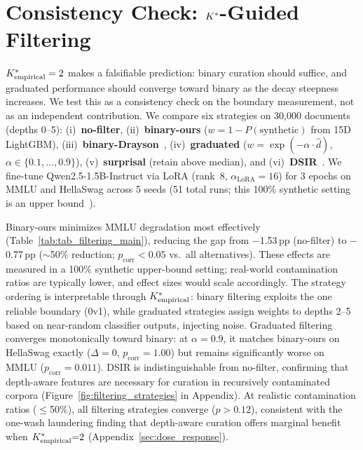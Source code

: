 \section{Consistency Check: ${K^*}$-Guided Filtering}
\label{sec:filtering}

${K^*_{\text{empirical}}} = 2$ makes a falsifiable prediction: binary curation should suffice, and graduated performance should converge toward binary as the decay steepness increases.
We test this as a consistency check on the boundary measurement, not as an independent contribution.
We compare six strategies on 30{,}000 documents (depths 0--5): (i)~\textbf{no-filter}, (ii)~\textbf{binary-ours} ($w = 1 - P(\text{synthetic})$ from 15D LightGBM), (iii)~\textbf{binary-Drayson}~\citep{drayson2025}, (iv)~\textbf{graduated} ($w = \exp(-\alpha \cdot \hat{d})$, $\alpha \in \{0.1,\ldots,0.9\}$), (v)~\textbf{surprisal} (retain above median), and (vi)~\textbf{DSIR}~\citep{xie2023dsir}.
We fine-tune Qwen2.5-1.5B-Instruct via LoRA (rank~8, $\alpha_{\text{LoRA}}{=}16$) for 3 epochs on MMLU and HellaSwag across 5 seeds (51 total runs; this 100\% synthetic setting is an upper bound~\cite{shumailov2024collapse, dohmatob2024model}).

\begin{table}[t]
\centering
\small
\caption{Downstream task performance (MMLU, HellaSwag) under six data-filtering strategies. Binary-ours uses the 15D LightGBM depth classifier; Graduated applies exponentially decaying weights $w = \exp(-\alpha \hat{d})$. Mean $\pm$ std over 5 seeds. Full $\alpha$ sweep in Appendix~\ref{sec:extended_limitations}.}
\label{tab:tab_filtering_main}

\end{table}

Binary-ours minimizes MMLU degradation most effectively (Table~\ref{tab:tab_filtering_main}), reducing the gap from $-$1.53\,pp (no-filter) to $-$0.77\,pp (${\sim}$50\% reduction; $p_{\text{corr}} < 0.05$ vs.\ all alternatives).
These effects are measured in a 100\% synthetic upper-bound setting; real-world contamination ratios are typically lower, and effect sizes would scale accordingly.
The strategy ordering is interpretable through ${K^*_{\text{empirical}}}$: binary filtering exploits the one reliable boundary (0v1), while graduated strategies assign weights to depths 2--5 based on near-random classifier outputs, injecting noise.
Graduated filtering converges monotonically toward binary: at $\alpha{=}0.9$, it matches binary-ours on HellaSwag exactly ($\Delta = 0$, $p_{\text{corr}} = 1.00$) but remains significantly worse on MMLU ($p_{\text{corr}} = 0.011$).
DSIR is indistinguishable from no-filter, confirming that depth-aware features are necessary for curation in recursively contaminated corpora (Figure~\ref{fig:filtering_strategies} in Appendix).
At realistic contamination ratios ($\leq$50\%), all filtering strategies converge ($p > 0.12$), consistent with the one-wash laundering finding that depth-aware curation offers marginal benefit when ${K^*_{\text{empirical}}}{=}2$ (Appendix~\ref{sec:dose_response}).
